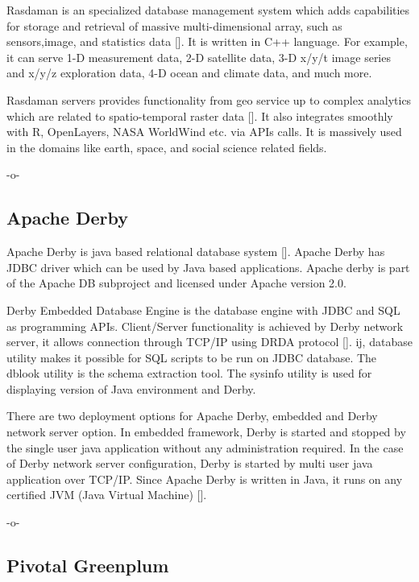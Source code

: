 Rasdaman is an specialized database management system which adds
capabilities for storage and retrieval of massive multi-dimensional
array, such as sensors,image, and statistics data
[\cite{www-rasdaman-wiki}]. It is written in C++ language. For
example, it can serve 1-D measurement data, 2-D satellite data, 3-D
x/y/t image series and x/y/z exploration data, 4-D ocean and climate
data, and much more.

Rasdaman servers provides functionality from geo service up to complex
analytics which are related to spatio-temporal raster
data [\cite{www-rasdaman-official}].  It also integrates smoothly with
R, OpenLayers, NASA WorldWind etc. via APIs calls. It is massively
used in the domains like earth, space, and social science related
fields.

     -o-
     
\subsection{Apache Derby}

Apache Derby is java based relational database
system [\cite{www-apachederby}]. Apache Derby has JDBC driver which can
be used by Java based applications. Apache derby is part of the Apache
DB subproject and licensed under Apache version 2.0.

Derby Embedded Database Engine is the database engine with JDBC and
SQL as programming APIs.  Client/Server functionality is achieved by
Derby network server, it allows connection through TCP/IP using DRDA
protocol [\cite{www-apachederbycharter}]. ij, database utility makes it
possible for SQL scripts to be run on JDBC database. The dblook
utility is the schema extraction tool. The sysinfo utility is used for
displaying version of Java environment and Derby.

There are two deployment options for Apache Derby, embedded and Derby
network server option. In embedded framework, Derby is started and
stopped by the single user java application without any administration
required. In the case of Derby network server configuration, Derby is
started by multi user java application over TCP/IP. Since Apache Derby
is written in Java, it runs on any certified JVM (Java Virtual
Machine) [\cite{www-derbymanual}].

     -o-
      
\subsection{Pivotal Greenplum}

